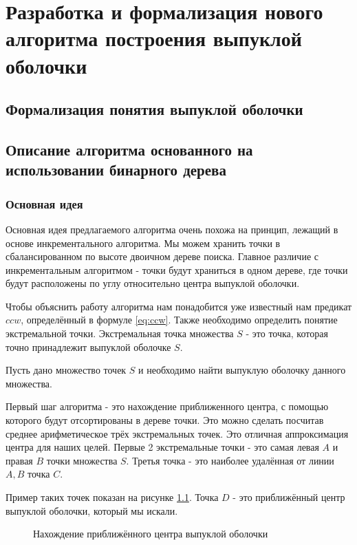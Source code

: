 \chapter{Разработка и формализация нового алгоритма построения выпуклой оболочки} \label{chapt2}

\section{Формализация понятия выпуклой оболочки} \label{sect2_1}

\section{Описание алгоритма основанного на использовании бинарного дерева} \label{sect2_2}

\subsection{Основная идея} \label{subsect2_2_1}

Основная идея предлагаемого алгоритма очень похожа на принцип, лежащий в основе инкрементального алгоритма. Мы можем хранить точки в сбалансированном по высоте двоичном дереве поиска. Главное различие с инкрементальным алгоритмом - точки будут храниться в одном дереве, где точки будут расположены по углу относительно центра выпуклой оболочки.

Чтобы объяснить работу алгоритма нам понадобится уже известный нам предикат $ccw$, определённый в формуле \ref{eq:ccw}. Также необходимо определить понятие экстремальной точки. Экстремальная точка множества $S$ - это точка, которая точно принадлежит выпуклой оболочке $S$.

Пусть дано множество точек $S$ и необходимо найти выпуклую оболочку данного множества.

Первый шаг алгоритма - это нахождение приближенного центра, с помощью которого будут отсортированы в дереве точки. Это можно сделать посчитав среднее арифметическое трёх экстремальных точек. Это отличная аппроксимация центра для наших целей. Первые 2 экстремальные точки -  это самая левая $A$ и правая $B$ точки множества $S$. Третья точка - это наиболее удалённая от линии $A, B$ точка $C$.

Пример таких точек показан на рисунке \ref{img:my_extreme_points}. Точка $D$ - это приближённый центр выпуклой оболочки, который мы искали.

\begin{figure}[H]
	{\centering
		\hfill
		\hfill
		\hfill
	}
	\caption{Нахождение приближённого центра выпуклой оболочки}
	\label{img:my_extreme_points}
\end{figure}


